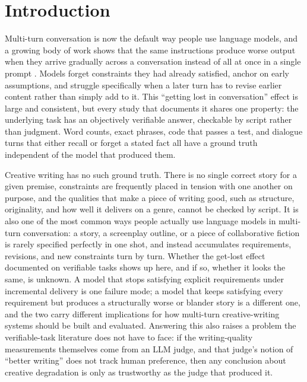 \section{Introduction}
\label{sec:introduction}

Multi-turn conversation is now the default way people use language models, and a growing body of work shows that the same instructions produce worse output when they arrive gradually across a conversation instead of all at once in a single prompt \citep{laban2025llmslostmultiturnconversation,he2024multiifbenchmarkingllmsmultiturn,jia2026battleanotherprobingllms,li2025structflowbenchstructuredflowbenchmark}. Models forget constraints they had already satisfied, anchor on early assumptions, and struggle specifically when a later turn has to revise earlier content rather than simply add to it. This ``getting lost in conversation'' effect is large and consistent, but every study that documents it shares one property: the underlying task has an objectively verifiable answer, checkable by script rather than judgment. Word counts, exact phrases, code that passes a test, and dialogue turns that either recall or forget a stated fact all have a ground truth independent of the model that produced them.

Creative writing has no such ground truth. There is no single correct story for a given premise, constraints are frequently placed in tension with one another on purpose, and the qualities that make a piece of writing good, such as structure, originality, and how well it delivers on a genre, cannot be checked by script. It is also one of the most common ways people actually use language models in multi-turn conversation: a story, a screenplay outline, or a piece of collaborative fiction is rarely specified perfectly in one shot, and instead accumulates requirements, revisions, and new constraints turn by turn. Whether the get-lost effect documented on verifiable tasks shows up here, and if so, whether it looks the same, is unknown. A model that stops satisfying explicit requirements under incremental delivery is one failure mode; a model that keeps satisfying every requirement but produces a structurally worse or blander story is a different one, and the two carry different implications for how multi-turn creative-writing systems should be built and evaluated. Answering this also raises a problem the verifiable-task literature does not have to face: if the writing-quality measurements themselves come from an LLM judge, and that judge's notion of ``better writing'' does not track human preference, then any conclusion about creative degradation is only as trustworthy as the judge that produced it.

